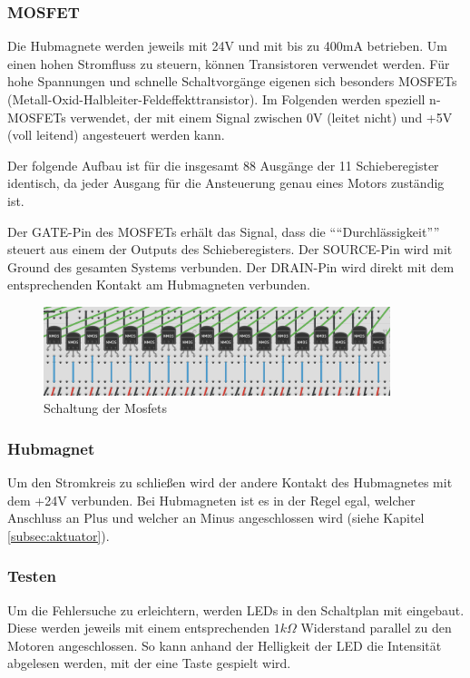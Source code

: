 \subsubsection{MOSFET}

Die Hubmagnete werden jeweils mit 24V und mit bis zu 400mA betrieben.
Um einen hohen Stromfluss zu steuern, können Transistoren verwendet werden.
Für hohe Spannungen und schnelle Schaltvorgänge eigenen sich besonders MOSFETs (Metall-Oxid-Halbleiter-Feldeffekttransistor).
Im Folgenden werden speziell n-MOSFETs verwendet, der mit einem Signal zwischen 0V (leitet nicht) und +5V (voll leitend) angesteuert werden kann.

Der folgende Aufbau ist für die insgesamt 88 Ausgänge der 11 Schieberegister identisch, da jeder Ausgang für die Ansteuerung genau eines Motors zuständig ist.

Der GATE-Pin des MOSFETs erhält das Signal, dass die \enquote{``Durchlässigkeit''} steuert aus einem der Outputs des Schieberegisters.
Der SOURCE-Pin wird mit Ground des gesamten Systems verbunden.
Der DRAIN-Pin wird direkt mit dem entsprechenden Kontakt am Hubmagneten verbunden.

\begin{figure}[htbp]
	\centering
	\includegraphics[width=0.9\textwidth]{img/MosSchaltung}
	\caption{Schaltung der Mosfets}
	\label{fig:SchaltungMosfet}
\end{figure}

\subsubsection{Hubmagnet}

Um den Stromkreis zu schließen wird der andere Kontakt des Hubmagnetes mit dem +24V verbunden.
Bei Hubmagneten ist es in der Regel egal, welcher Anschluss an Plus und welcher an Minus angeschlossen wird
(siehe Kapitel \ref{subsec:aktuator}).

\subsubsection{Testen}

Um die Fehlersuche zu erleichtern, werden LEDs in den Schaltplan mit eingebaut.
Diese werden jeweils mit einem entsprechenden $1k\Omega$ Widerstand parallel zu den Motoren angeschlossen.
So kann anhand der Helligkeit der LED die Intensität abgelesen werden, mit der eine Taste gespielt wird.
\newline

